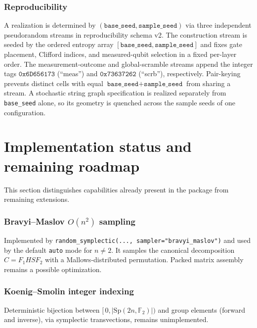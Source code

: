 \documentclass[11pt]{article}
\theoremstyle{definition}
\theoremstyle{plain}
\newcommand{\F}{\mathbb{F}}
\newcommand{\Sp}{\mathrm{Sp}}
\begin{document}
\section{Reproducibility}
\label{sec:rng}

A realization is determined by $(\texttt{base\_seed},\texttt{sample\_seed})$ via
three independent pseudorandom streams in reproducibility schema v2. The
construction stream is seeded by the ordered entropy array
$[\texttt{base\_seed},\texttt{sample\_seed}]$ and fixes gate placement,
Clifford indices, and measured-qubit selection in a fixed per-layer order. The
measurement-outcome and global-scramble streams append the integer tags
$\texttt{0x6D656173}$ (``meas'') and $\texttt{0x73637262}$ (``scrb''),
respectively. Pair-keying prevents distinct cells with equal
$\texttt{base\_seed}+\texttt{sample\_seed}$ from sharing a stream. A stochastic
string graph specification is realized separately from \texttt{base\_seed} alone,
so its geometry is quenched across the sample seeds of one configuration.

\part{Implementation status and remaining roadmap}
\label{sec:roadmap}

This section distinguishes capabilities already present in the package from
remaining extensions.

\section{Bravyi--Maslov \texorpdfstring{$O(n^2)$}{O(n^2)} sampling}
\label{sec:roadmap-bm}
Implemented by \texttt{random\_symplectic(..., sampler="bravyi\_maslov")} and
used by the default \texttt{auto} mode for $n\ne2$. It samples the canonical
decomposition $C=F_1HSF_2$ with a Mallows-distributed permutation. Packed matrix
assembly remains a possible optimization.

\section{Koenig--Smolin integer indexing}
Deterministic bijection between $[\,0,|\Sp(2n,\F_2)|)$ and group elements (forward
and inverse), via symplectic transvections, remains unimplemented.
\end{document}
